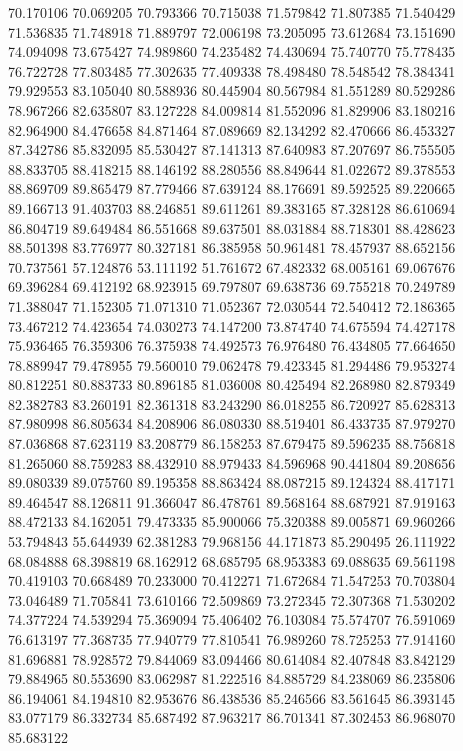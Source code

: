 70.170106
70.069205
70.793366
70.715038
71.579842
71.807385
71.540429
71.536835
71.748918
71.889797
72.006198
73.205095
73.612684
73.151690
74.094098
73.675427
74.989860
74.235482
74.430694
75.740770
75.778435
76.722728
77.803485
77.302635
77.409338
78.498480
78.548542
78.384341
79.929553
83.105040
80.588936
80.445904
80.567984
81.551289
80.529286
78.967266
82.635807
83.127228
84.009814
81.552096
81.829906
83.180216
82.964900
84.476658
84.871464
87.089669
82.134292
82.470666
86.453327
87.342786
85.832095
85.530427
87.141313
87.640983
87.207697
86.755505
88.833705
88.418215
88.146192
88.280556
88.849644
81.022672
89.378553
88.869709
89.865479
87.779466
87.639124
88.176691
89.592525
89.220665
89.166713
91.403703
88.246851
89.611261
89.383165
87.328128
86.610694
86.804719
89.649484
86.551668
89.637501
88.031884
88.718301
88.428623
88.501398
83.776977
80.327181
86.385958
50.961481
78.457937
88.652156
70.737561
57.124876
53.111192
51.761672
67.482332
68.005161
69.067676
69.396284
69.412192
68.923915
69.797807
69.638736
69.755218
70.249789
71.388047
71.152305
71.071310
71.052367
72.030544
72.540412
72.186365
73.467212
74.423654
74.030273
74.147200
73.874740
74.675594
74.427178
75.936465
76.359306
76.375938
74.492573
76.976480
76.434805
77.664650
78.889947
79.478955
79.560010
79.062478
79.423345
81.294486
79.953274
80.812251
80.883733
80.896185
81.036008
80.425494
82.268980
82.879349
82.382783
83.260191
82.361318
83.243290
86.018255
86.720927
85.628313
87.980998
86.805634
84.208906
86.080330
88.519401
86.433735
87.979270
87.036868
87.623119
83.208779
86.158253
87.679475
89.596235
88.756818
81.265060
88.759283
88.432910
88.979433
84.596968
90.441804
89.208656
89.080339
89.075760
89.195358
88.863424
88.087215
89.124324
88.417171
89.464547
88.126811
91.366047
86.478761
89.568164
88.687921
87.919163
88.472133
84.162051
79.473335
85.900066
75.320388
89.005871
69.960266
53.794843
55.644939
62.381283
79.968156
44.171873
85.290495
26.111922
68.084888
68.398819
68.162912
68.685795
68.953383
69.088635
69.561198
70.419103
70.668489
70.233000
70.412271
71.672684
71.547253
70.703804
73.046489
71.705841
73.610166
72.509869
73.272345
72.307368
71.530202
74.377224
74.539294
75.369094
75.406402
76.103084
75.574707
76.591069
76.613197
77.368735
77.940779
77.810541
76.989260
78.725253
77.914160
81.696881
78.928572
79.844069
83.094466
80.614084
82.407848
83.842129
79.884965
80.553690
83.062987
81.222516
84.885729
84.238069
86.235806
86.194061
84.194810
82.953676
86.438536
85.246566
83.561645
86.393145
83.077179
86.332734
85.687492
87.963217
86.701341
87.302453
86.968070
85.683122

